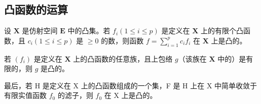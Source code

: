 \subsection{凸函数的运算}

设 \(\mathbf{X}\) 是仿射空间 \(\mathbf{E}\) 中的凸集。若 \(f_{i}(1 \leqslant i \leqslant p)\) 是定义在 \(\mathbf{X}\) 上的有限个凸函数，且 \(c_{i} (1 \leqslant i \leqslant p)\) 是 \(\geqslant 0\) 的数，则函数 \(f = \sum_{i=1}^{p} c_{i} f_{i}\) 在 \(\mathbf{X}\) 上是凸的。

若 \((f_{i})\) 是定义在 \(\mathbf{X}\) 上的凸函数的任意族，且上包络 \(g\)（该族在 \(\mathbf{X}\) 中的）是有限的，则 \(g\) 是凸的。

最后，若 H 是定义在 X 上的凸函数组成的一个集，F 是 H 上在 X 中简单收敛于有限实值函数 \(f_{0}\) 的滤子，则 \(f_{0}\) 在 X 上是凸的。

